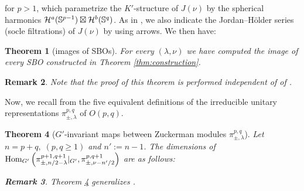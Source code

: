 \documentclass[12pt]{article} %
\newtheorem{theorem}{Theorem}
\newcommand{\Hom}{\mbox{\normalfont Hom}}
\newtheorem{remark}[theorem]{Remark}
\theoremstyle{definition}
\theoremstyle{exampstyle} \newtheorem{examp}[theorem]{Theorem}
\begin{document}
	for $p>1$, which parametrize the $K'$-structure of $J(\nu)$ by the spherical harmonics $\mathcal{H}^a(\mathbb{S}^{p-1})\boxtimes\mathcal{H}^b(\mathbb{S}^q)$.
	As in \cite{howe1993homogeneous}, we also indicate the Jordan--H\"older series (socle filtrations) of $J(\nu)$ by using arrows.
	We then have:
\begin{theorem}[images of SBOs]
	For every $(\lambda,\nu)$ we have computed the image of every SBO constructed in Theorem \ref{thm:construction}.
\end{theorem}
\begin{remark}
	Note that
	the proof of this theorem is performed \textit{independent of} of \cite{howe1993homogeneous}.
\end{remark}
Now, we recall from \cite{KO2} the five equivalent definitions of the
irreducible unitary representations $\pi_{\pm,\lambda}^{p,q}$ of $O(p,q)$.
\begin{theorem}[$G'$-invariant maps between Zuckerman modules $\pi_{\pm,\lambda}^{p,q}$]\label{thm:Aq}
	Let $n=p+q,\;(p,q\ge1)$ and $n':=n-1$.
	The dimensions of $\Hom_{G'}\left(\pi_{\pm,{n}/{2}-\lambda}^{p+1,q+1}\kern-0.3em\mid_{G'} ,\pi_{\pm,\nu-{n'}/{2}}^{p,q+1} \right)$
	are as follows:\newline
{}\\\vspace{\baselineskip}
\begin{remark}
Theorem \ref{thm:Aq} generalizes \cite[Thms. 12.1 and 1.3]{kobayashi2015symmetry}.
\end{remark}
\end{theorem}
\nocite{kobayashi2015program}
\small


\end{document}
